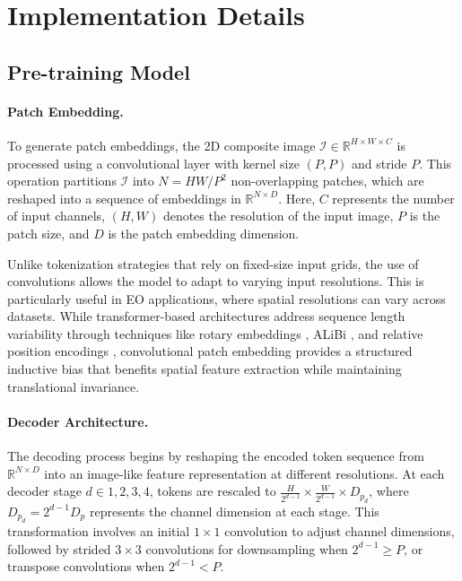 \section{Implementation Details}\label{appendix:implementation_details}

\subsection{Pre-training Model}

\paragraph{Patch Embedding.} To generate patch embeddings, the 2D composite image $\mathcal{I} \in \mathbb{R}^{H \times W \times C}$ is processed using a convolutional layer with kernel size $(P, P)$ and stride $P$. This operation partitions $\mathcal{I}$ into $N = HW/P^2$ non-overlapping patches, which are reshaped into a sequence of embeddings in $\mathbb{R}^{N \times D}$. Here, $C$ represents the number of input channels, $(H, W)$ denotes the resolution of the input image, $P$ is the patch size, and $D$ is the patch embedding dimension.

Unlike tokenization strategies that rely on fixed-size input grids, the use of convolutions allows the model to adapt to varying input resolutions. This is particularly useful in EO applications, where spatial resolutions can vary across datasets. While transformer-based architectures address sequence length variability through techniques like rotary embeddings \cite{su2021roformer}, ALiBi \cite{press2022train}, and relative position encodings \cite{shaw2018self}, convolutional patch embedding provides a structured inductive bias that benefits spatial feature extraction while maintaining translational invariance.

\paragraph{Decoder Architecture.} The decoding process begins by reshaping the encoded token sequence from $\mathbb{R}^{N \times D}$ into an image-like feature representation at different resolutions. At each decoder stage $d \in {1,2,3,4}$, tokens are rescaled to $\frac{H}{2^{d-1}} \times \frac{W}{2^{d-1}} \times D_{p_d}$, where $D_{p_d} = 2^{d-1}D_p$ represents the channel dimension at each stage. This transformation involves an initial $1 \times 1$ convolution to adjust channel dimensions, followed by strided $3 \times 3$ convolutions for downsampling when $2^{d-1} \geq P$, or transpose convolutions when $2^{d-1} < P$.

